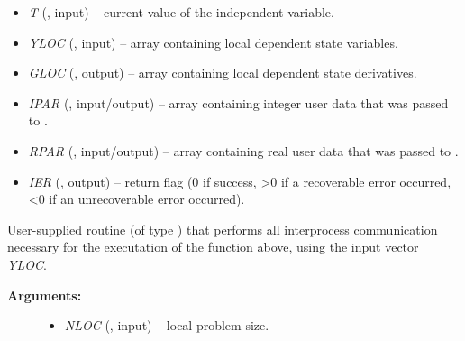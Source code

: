 \documentclass[letterpaper,10pt,english]{sphinxmanual}
\begin{document}
\begin{enumerate}
\begin{fulllineitems}
\begin{description}
\begin{itemize}
\item {} 
\emph{T} (, input) -- current value of the
independent variable.

\item {} 
\emph{YLOC} (, input) -- array containing local
dependent state variables.

\item {} 
\emph{GLOC} (, output) -- array containing local
dependent state derivatives.

\item {} 
\emph{IPAR} (, input/output) -- array containing
integer user data that was passed to
{\hyperref[f_interface/Usage:f/_/FARKMALLOC]{\emph{}}}.

\item {} 
\emph{RPAR} (, input/output) -- array containing
real user data that was passed to {\hyperref[f_interface/Usage:f/_/FARKMALLOC]{\emph{}}}.

\item {} 
\emph{IER} (, output) -- return flag (0 if success, \textgreater{}0
if a recoverable error occurred, \textless{}0 if an unrecoverable
error occurred).

\end{itemize}

\end{description}

\end{fulllineitems}


\begin{fulllineitems}
\label{f_interface/Preconditioning:f/_/FARKCOMMFN}
User-supplied routine (of type {\hyperref[c_interface/Preconditioners:c.ARKCommFn]{\emph{}}}) that
performs all interprocess communication necessary for the
executation of the {\hyperref[f_interface/Preconditioning:f/_/FARKGLOCFN]{\emph{}}} function above, using
the input vector \emph{YLOC}.
\begin{description}
\item[{\textbf{Arguments:}}] \leavevmode\begin{itemize}
\item {} 
\emph{NLOC} (, input) -- local problem size.


\end{itemize}
\end{description}
\end{fulllineitems}
\end{enumerate}
\end{document}
